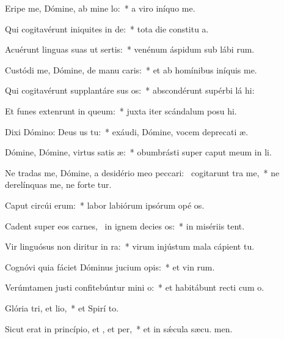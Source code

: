 \item Eripe me, Dómine, ab mine lo:~* a viro iníquo  me.
\item Qui cogitavérunt iniquites in de:~* tota die constitu a.
\item Acuérunt linguas suas ut sertis:~* venénum áspidum sub lábi rum.
\item Custódi me, Dómine, de manu caris:~* et ab homínibus iníquis  me.
\item Qui cogitavérunt supplantáre sus os:~* abscondérunt supérbi lá hi:
\item Et funes extenrunt in queum:~* juxta iter scándalum posu hi.
\item Dixi Dómino: Deus us  tu:~* exáudi, Dómine, vocem deprecati æ.
\item Dómine, Dómine, virtus satis æ:~* obumbrásti super caput meum in  li.
\item Ne tradas me, Dómine, a desidério meo peccari:~\pscross{} cogitarunt tra me,~* ne derelínquas me, ne forte tur.
\item Caput circúi erum:~* labor labiórum ipsórum opé os.
\item Cadent super eos carnes,~\pscross{} in ignem decies os:~* in misériis  tent.
\item Vir linguósus non diritur in ra:~* virum injústum mala cápient  tu.
\item Cognóvi quia fáciet Dóminus jucium opis:~* et vin rum.
\item Verúmtamen justi confitebúntur mini o:~* et habitábunt recti cum  o.
\item Glória tri, et lio,~* et Spirí to.
\item Sicut erat in princípio, et , et per,~* et in sǽcula sæcu. men.
